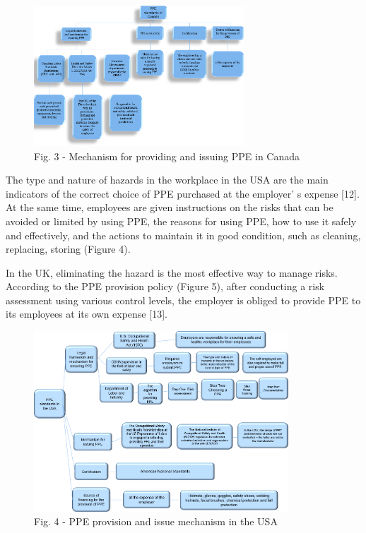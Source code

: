 \begin{figure}[H]
	\centering
	\includegraphics[width=0.7\textwidth]{media/chem2/image4}
	\caption*{Fig. 3 - Mechanism for providing and issuing PPE in Canada}
\end{figure}

\begin{multicols}{2}
The type and nature of hazards in the workplace in the USA are the main
indicators of the correct choice of PPE purchased at the
employer' s expense {[}12{]}. At the same time, employees
are given instructions on the risks that can be avoided or limited by
using PPE, the reasons for using PPE, how to use it safely and
effectively, and the actions to maintain it in good condition, such as
cleaning, replacing, storing (Figure 4).

In the UK, eliminating the hazard is the most effective way to manage
risks. According to the PPE provision policy (Figure 5), after
conducting a risk assessment using various control levels, the employer
is obliged to provide PPE to its employees at its own expense {[}13{]}.
\end{multicols}

\begin{figure}[H]
	\centering
	\includegraphics[width=0.85\textwidth]{media/chem2/image5}
	\caption*{Fig. 4 - PPE provision and issue mechanism in the USA}
\end{figure}

